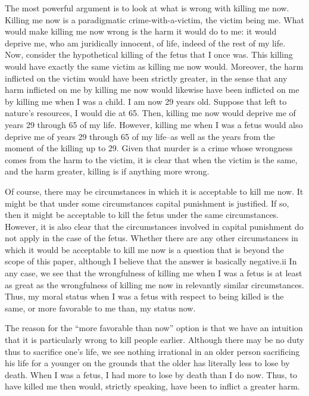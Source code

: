The most powerful argument is to look at what is wrong with killing 
me  now.    Killing  me  now  is  a  paradigmatic  crime-with-a-victim,  the 
victim being me.  What would make killing me now wrong is the harm it 
would do to me: it would deprive me, who am juridically innocent, of 
life, indeed of the rest of my life.  Now, consider the hypothetical killing 
of the fetus that I once was.  This killing would have exactly the same 
victim as killing me now would.  Moreover, the harm inflicted on the 
victim  would  have  been  strictly  greater,  in  the  sense  that  any  harm 
inflicted on me by killing me now would likewise have been inflicted on 
me by killing me when I was a child.  I am now 29 years old.  Suppose 
that left to nature’s resources, I would die at 65.  Then, killing me now 
would deprive me of years 29 through 65 of my life.  However, killing 
me when I was a fetus would also deprive me of years 29 through 65 of 
my  life–as  well  as  the  years  from  the  moment  of  the killing up to 29.  
Given that murder is a crime whose wrongness comes from the harm to 
the  victim,  it  is  clear  that  when  the  victim  is  the  same,  and  the  harm 
greater, killing is if anything more wrong. 

Of course, there may be circumstances in which it is acceptable to 
kill  me  now.    It  might  be  that  under  some  circumstances  capital 
punishment is justified.  If so, then it might be acceptable to kill the fetus 
under  the  same  circumstances.    However,  it  is  also  clear  that  the 
circumstances involved in capital punishment do not apply in the case of 
the fetus.  Whether there are any other circumstances in which it would 
be acceptable to kill me now is a question that is beyond the scope of this 
paper, although I believe that the answer is basically negative.ii  In any 
case, we see that the wrongfulness of killing me when I was a fetus is at 
least as great as the wrongfulness of killing me now in relevantly similar 
circumstances.  Thus, my moral status when I was a fetus with respect to 
being killed is the same, or more favorable to me than, my status now. 

The reason for the “more favorable than now” option is that we have
an intuition that it is particularly wrong to kill people earlier.  Although 
there may be no duty thus to sacrifice one’s life, we see nothing irrational 
in an older person sacrificing his life for a younger on the grounds that 
the older has literally less to lose by death.  When I was a fetus, I had 
more to lose by death than I do now.  Thus, to have killed me then would, 
strictly speaking, have been to inflict a greater harm. 

